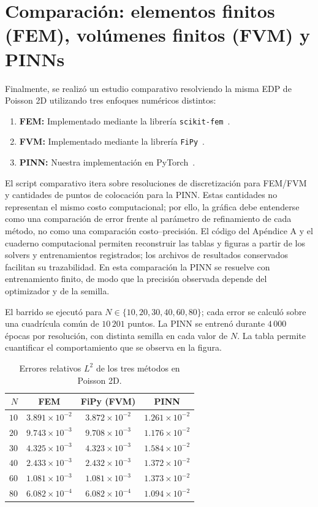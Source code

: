 \section{Comparación: elementos finitos (FEM), volúmenes finitos (FVM) y PINNs}
\label{sec:comparacion}

Finalmente, se realizó un estudio comparativo resolviendo la misma EDP de Poisson 2D utilizando tres enfoques numéricos distintos:
\begin{enumerate}
    \item \textbf{FEM:} Implementado mediante la librería \texttt{scikit-fem}~\cite{gustafsson2020scikitfem}.
    \item \textbf{FVM:} Implementado mediante la librería \texttt{FiPy}~\cite{guyer2009fipy}.
    \item \textbf{PINN:} Nuestra implementación en PyTorch~\cite{paszke2019pytorch}.
\end{enumerate}
El script comparativo itera sobre resoluciones de discretización para FEM/FVM y cantidades de puntos de colocación para la PINN. Estas cantidades no representan el mismo costo computacional; por ello, la gráfica debe entenderse como una comparación de error frente al parámetro de refinamiento de cada método, no como una comparación costo--precisión. El código del Apéndice A y el cuaderno computacional permiten reconstruir las tablas y figuras a partir de los solvers y entrenamientos registrados; los archivos de resultados conservados facilitan su trazabilidad. En esta comparación la PINN se resuelve con entrenamiento finito, de modo que la precisión observada depende del optimizador y de la semilla.

El barrido se ejecutó para $N\in\{10,20,30,40,60,80\}$; cada error se calculó sobre una cuadrícula común de $10\,201$ puntos. La PINN se entrenó durante $4\,000$ épocas por resolución, con distinta semilla en cada valor de $N$. La tabla permite cuantificar el comportamiento que se observa en la figura.

\begin{table}[htbp]
\centering
\caption{Errores relativos $L^2$ de los tres métodos en Poisson 2D.}
\label{tab:comparacion_fem_fvm}
\small
\begin{tabular}{rccc}
\hline
$N$ & FEM & FiPy (FVM) & PINN \\
\hline
$10$ & $3.891\times10^{-2}$ & $3.872\times10^{-2}$ & $1.261\times10^{-2}$ \\
$20$ & $9.743\times10^{-3}$ & $9.708\times10^{-3}$ & $1.176\times10^{-2}$ \\
$30$ & $4.325\times10^{-3}$ & $4.323\times10^{-3}$ & $1.584\times10^{-2}$ \\
$40$ & $2.433\times10^{-3}$ & $2.432\times10^{-3}$ & $1.372\times10^{-2}$ \\
$60$ & $1.081\times10^{-3}$ & $1.081\times10^{-3}$ & $1.373\times10^{-2}$ \\
$80$ & $6.082\times10^{-4}$ & $6.082\times10^{-4}$ & $1.094\times10^{-2}$ \\
\hline
\end{tabular}
\end{table}

